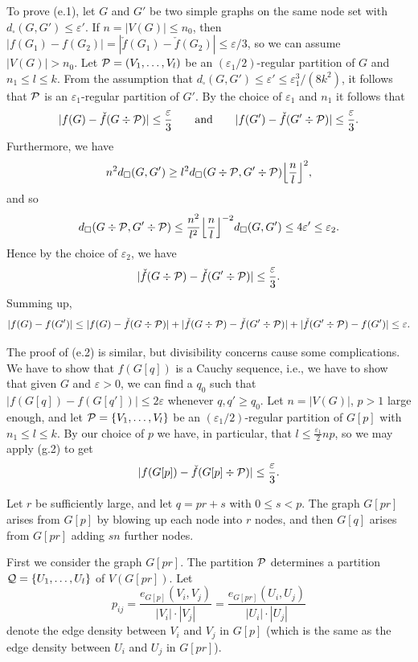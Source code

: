 \documentclass[12pt]{article}
\numberwithin{equation}{section}
\def\eps{\varepsilon}
\def\PP{{\cal P}}\def\QQ{{\cal Q}}\def\RR{{\cal R}}
\begin{document}
To prove (e.1), let $G$ and $G'$ be two simple graphs on the same
node set with $d_\square(G,G')\le\eps'$. If $n=|V(G)|\leq n_0$, then
$|f(G_1)-f(G_2)|=|\check{f}(G_1)-\check{f}(G_2)|\le\eps/3$, so we can
assume $|V(G)|>n_0$. Let $\PP=(V_1,\dots,V_l)$ be an
$(\eps_1/2)$-regular partition of $G$ and $n_1\leq l\leq k$. From the
assumption that $d_\square(G,G')\le\eps'\le \eps_1^3/(8k^2)$, it
follows that $\PP$ is an $\eps_1$-regular partition of $G'$. By the
choice of $\eps_1$ and $n_1$ it follows that
\[
|f(G)-\check{f}(G\div\PP)|\le\frac{\eps}{3}\qquad\text{and}\qquad
|f(G')-\check{f}(G'\div\PP)|\le\frac{\eps}{3}.
\]
Furthermore, we have
\[
n^2 d_\square(G,G')\ge l^2 d_\square(G\div\PP,G'\div\PP)
\Bigl\lfloor \frac nl \Bigr\rfloor^2,
\]
and so
\[
d_\square(G\div\PP,G'\div\PP) \le \frac{n^2}{l^2}
\Bigl\lfloor \frac nl \Bigr\rfloor^{-2}
d_\square(G,G')\le 4\eps'\leq \eps_2.
\]
Hence by the choice of $\eps_2$, we have
\[
|\check{f}(G\div\PP)-\check{f}(G'\div\PP)|\le\frac{\eps}{3}.
\]
Summing up,
\[
|f(G)-f(G')|\le
|f(G)-\check{f}(G\div\PP)|+|\check{f}(G\div\PP)-\check{f}(G'\div\PP)|
+|\check{f}(G'\div\PP)-f(G')| \le \eps.
\]

The proof of (e.2) is similar, but divisibility concerns cause some
complications. We have to show that $f(G[q])$ is a Cauchy sequence,
i.e., we have to show that given $G$ and $\eps>0$, we can find a
$q_0$ such that $|f(G[q])-f(G[q'])|\le 2\eps$ whenever $q,q'\geq
q_0$. Let $n=|V(G)|$, $p>1$ large enough, and let
$\PP=\{V_1,\dots,V_l\}$ be an $(\eps_1/2)$-regular partition of
$G[p]$ with $n_1\le l\le k$. By our choice of $p$ we have, in
particular, that $l\leq \frac{\eps_1}{2}np$, so we may apply (g.2)
to get
\begin{equation}\label{FGP}
|f(G[p])-\check{f}(G[p]\div\PP)|\le\frac{\eps}{3}.
\end{equation}

Let $r$ be sufficiently large, and let $q=pr+s$ with $0\leq s<p$.
The graph $G[pr]$ arises from $G[p]$ by blowing up each node into
$r$ nodes, and then $G[q]$ arises from $G[pr]$ adding $sn$ further
nodes.

First we consider the graph $G[pr]$. The partition $\PP$ determines
a partition $\QQ=\{U_1,\dots,U_l\}$ of $V(G[pr])$. Let
\[
p_{ij}=\frac{e_{G[p]}(V_i,V_j)}{|V_i|\cdot|V_j|}
=\frac{e_{G[pr]}(U_i,U_j)}{|U_i|\cdot|U_j|}
\]
denote the edge density between $V_i$ and $V_j$ in $G[p]$ (which is
the same as the edge density between $U_i$ and $U_j$ in $G[pr]$).
\end{document}
